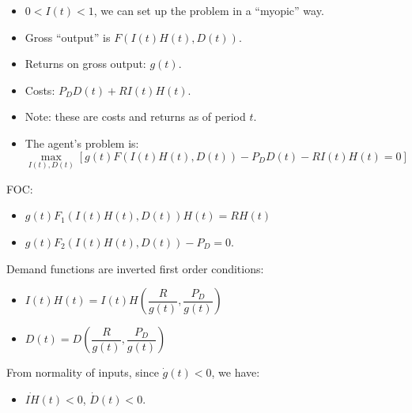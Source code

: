 \documentclass[12pt,compress,handout]{beamer}  %
\begin{document}
\begin{frame}

\begin{itemize}[<+->]
\item
$0 < I(t) < 1$, we can set up the problem in a ``myopic''
way.\medskip

\item
Gross ``output'' is $F(I(t)H(t),D(t))$.\medskip

\item
Returns on gross output: $g(t)$.\medskip

\item
Costs: $P_{D}D(t) + RI(t)H(t)$.\medskip

\item
Note: these are costs and returns as of period $t$.
\end{itemize}
\end{frame}


\begin{frame}

\small

\begin{itemize}[<+->]
\item
The agent's problem is:
\begin{equation*}
    \max_{I(t),D(t)}\left[  g(t) F(I(t)H(t),D(t)) - P_{D}D(t)
    - RI(t)H(t)=0\right]
\end{equation*}
\end{itemize}

FOC:
\begin{itemize}
\item
$g(t)F_{1}(I(t)H(t),D(t))H(t)=RH(t)$

\item
$g(t)F_{2}(I(t)H(t),D(t)) -P_{D}=0$.
\end{itemize}

Demand functions are inverted first order conditions:

\begin{itemize}[<+->]
\item
$I(t)H(t)=I(t)H\left( \dfrac{R}{g(t)},\dfrac{P_{D}}{g(t)}\right)$

\item
$D(t)=D\left( \dfrac{R}{g(t)},\dfrac{P_{D}}{g(t)}\right)$
\end{itemize}

From normality of inputs, since $\dot{g}(t)<0$, we have:

\begin{itemize}
\item $\dot{IH}(t)<0$, $\dot{D}(t)<0$.
\end{itemize}
\end{frame}
\end{document}
